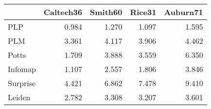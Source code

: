 \begin{tabular}{lrrrr}
\toprule
{} & Caltech36 & Smith60 & Rice31 & Auburn71 \\
\midrule
PLP      &     0.984 &   1.270 &  1.097 &    1.595 \\
PLM      &     3.361 &   4.117 &  3.906 &    4.462 \\
Potts    &     1.709 &   3.888 &  3.559 &    6.350 \\
Infomap  &     1.107 &   2.557 &  1.806 &    3.846 \\
Surprise &     4.421 &   6.862 &  7.478 &    9.410 \\
Leiden   &     2.782 &   3.308 &  3.207 &    3.601 \\
\bottomrule
\end{tabular}
